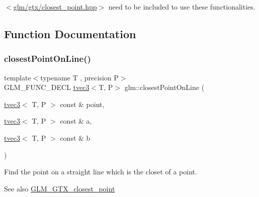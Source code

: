 $<$\hyperlink{closest__point_8hpp}{glm/gtx/closest\+\_\+point.\+hpp}$>$ need to be included to use these functionalities. 

\subsection{Function Documentation}
\mbox{\label{group__gtx__closest__point_gac26353282a8213e469f5e33560c1200f}} 
\subsubsection{\texorpdfstring{closest\+Point\+On\+Line()}{closestPointOnLine()}}
{\footnotesize\ttfamily template$<$typename T , precision P$>$ \\
G\+L\+M\+\_\+\+F\+U\+N\+C\+\_\+\+D\+E\+CL \hyperlink{structglm_1_1tvec3}{tvec3}$<$T, P$>$ glm\+::closest\+Point\+On\+Line (\begin{DoxyParamCaption}\item[{\hyperlink{structglm_1_1tvec3}{tvec3}$<$ T, P $>$ const \&}]{point,  }\item[{\hyperlink{structglm_1_1tvec3}{tvec3}$<$ T, P $>$ const \&}]{a,  }\item[{\hyperlink{structglm_1_1tvec3}{tvec3}$<$ T, P $>$ const \&}]{b }\end{DoxyParamCaption})}

Find the point on a straight line which is the closet of a point. \begin{DoxySeeAlso}{See also}
\hyperlink{group__gtx__closest__point}{G\+L\+M\+\_\+\+G\+T\+X\+\_\+closest\+\_\+point} 
\end{DoxySeeAlso}
